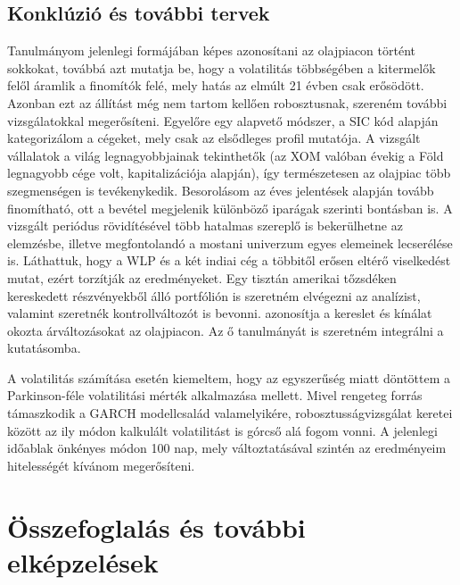 \documentclass[12pt,bibliography=totoc]{article}
\begin{document}




\subsection{Konklúzió és további tervek}
Tanulmányom jelenlegi formájában képes azonosítani az olajpiacon történt sokkokat, továbbá azt mutatja be, hogy a volatilitás többségében a kitermelők felől áramlik a finomítók felé, mely hatás az elmúlt 21 évben csak erősödött. Azonban ezt az állítást még nem tartom kellően robosztusnak, szereném további vizsgálatokkal megerősíteni. Egyelőre egy alapvető módszer, a SIC kód alapján kategorizálom a cégeket, mely csak az elsődleges profil mutatója. A vizsgált vállalatok a világ legnagyobbjainak tekinthetők (az XOM valóban évekig a Föld legnagyobb cége volt, kapitalizációja alapján), így természetesen az olajpiac több szegmenségen is tevékenykedik. Besorolásom az éves jelentések alapján tovább finomítható, ott a bevétel megjelenik különböző iparágak szerinti bontásban is. A vizsgált periódus rövidítésével több hatalmas szereplő is bekerülhetne az elemzésbe, illetve megfontolandó a mostani univerzum egyes elemeinek lecserélése is. Láthattuk, hogy a WLP és a két indiai cég a többitől erősen eltérő viselkedést mutat, ezért torzítják az eredményeket. Egy tisztán amerikai tőzsdéken kereskedett részvényekből álló portfólión is szeretném elvégezni az analízist, valamint szeretnék kontrollváltozót is bevonni. \cite{kilian2009not} azonosítja a kereslet és kínálat okozta árváltozásokat az olajpiacon. Az ő tanulmányát is szeretném integrálni a kutatásomba. 

A volatilitás számítása esetén kiemeltem, hogy az egyszerűség miatt döntöttem a Parkinson-féle volatilitási mérték alkalmazása mellett. Mivel rengeteg forrás támaszkodik a GARCH modellcsalád valamelyikére, robosztusságvizsgálat keretei között az ily módon kalkulált volatilitást is górcső alá fogom vonni. A jelenlegi időablak önkényes módon 100 nap, mely változtatásával szintén az eredményeim hitelességét kívánom megerősíteni.



\newpage

\section{Összefoglalás és további elképzelések}
\end{document}

